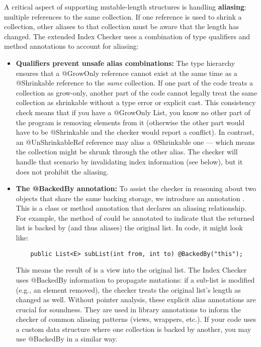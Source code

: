 A critical aspect of supporting mutable-length structures is handling \textbf{aliasing}:
multiple references to the same collection. If one reference is used to shrink a collection,
other aliases to that collection must be aware that the length has changed. The extended Index
Checker uses a combination of type qualifiers and method annotations to account for aliasing:
\begin{itemize}
\item
  \textbf{Qualifiers prevent unsafe alias combinations:}
  The type hierarchy ensures that a @GrowOnly reference cannot exist at the same time as a
  @Shrinkable reference to the \emph{same} collection. If one part of the code treats a collection
  as grow-only, another part of the code cannot legally treat the same collection as shrinkable
  without a type error or explicit cast. This consistency check means that if you have a @GrowOnly
  List, you know no other part of the program is removing elements from it (otherwise the other
  part would have to be @Shrinkable and the checker would report a conflict). In contrast, an
  @UnShrinkableRef reference may alias a @Shrinkable one — which means the collection might be shrunk
  through the other alias. The checker will handle that scenario by invalidating index information (see below),
  but it does not prohibit the aliasing.

\item
  \textbf{The @BackedBy annotation:}
  To assist the checker in reasoning about two objects that share the same backing storage,
  we introduce an annotation . This is a class or method annotation
  that declares an aliasing relationship. For example, the  method of 
  could be annotated to indicate that the returned list is backed by (and thus aliases) the original
  list. In code, it might look like:

\begin{Verbatim}
    public List<E> subList(int from, int to) @BackedBy("this");
\end{Verbatim}

  This means the result of  is a view into the original list. The Index Checker uses
  @BackedBy information to propagate mutations: if a sub-list is modified (e.g., an element removed),
  the checker treats the original list’s length as changed as well. Without pointer analysis,
  these explicit alias annotations are crucial for soundness. They are used in library annotations
  to inform the checker of common aliasing patterns (views, wrappers, etc.). If your code uses a
  custom data structure where one collection is backed by another, you may use @BackedBy in a similar
  way.


\end{itemize}
